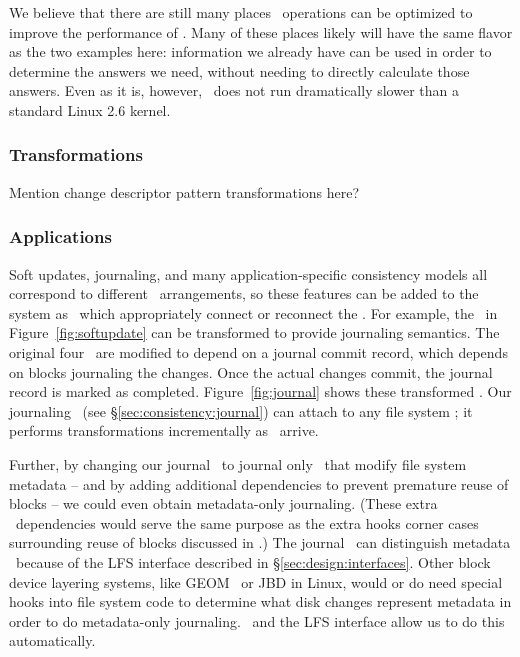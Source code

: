 We believe that there are still many places \chdesc\ operations can be
optimized to improve the performance of \Kudos. Many of these places likely
will have the same flavor as the two examples here: information we already have
can be used in order to determine the answers we need, without needing to
directly calculate those answers. Even as it is, however, \Kudos\ does not run
dramatically slower than a standard Linux 2.6 kernel.

\subsubsection {Transformations}
Mention change descriptor pattern transformations here?

\subsubsection {Applications}
Soft updates, journaling, and many application-specific consistency
models all correspond to different \chdesc\ arrangements, so these
features can be added to the system as \modules\ which appropriately
connect or reconnect the \chdescs.  For example, the \chdescs\ in
Figure~\ref{fig:softupdate} can be transformed to provide journaling
semantics. The original four \chdescs\ are modified to depend on a
journal commit record, which depends on blocks journaling the
changes. Once the actual changes commit, the journal record is marked
as completed.  Figure~\ref{fig:journal} shows these transformed
\chdescs. Our journaling \module\ (see
\S\ref{sec:consistency:journal}) can attach to any file system
\module; it performs transformations incrementally as \chdescs\
arrive.

Further, by changing our journal \module\ to journal only \chdescs\
that modify file system metadata -- and by adding additional
dependencies to prevent premature reuse of blocks -- we could even
obtain metadata-only journaling.  (These extra \chdesc\ dependencies
would serve the same purpose as the extra hooks corner cases
surrounding reuse of blocks discussed in \cite{tweedie00ext3}.) The
journal \module\ can distinguish metadata \chdescs\ because of the LFS
interface described in \S\ref{sec:design:interfaces}. Other block
device layering systems, like GEOM~\cite{geom} or JBD in Linux, would
or do need special hooks into file system code to determine what disk
changes represent metadata in order to do metadata-only
journaling. \Chdescs\ and the LFS interface allow us to do this
automatically.
